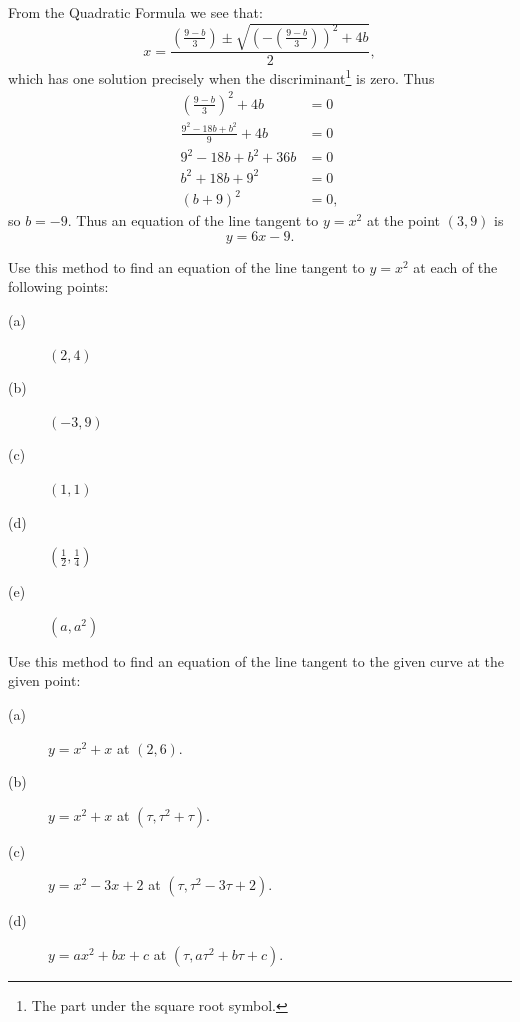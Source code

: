 \begin{myexample}
    From the Quadratic Formula we see that:
    $$
    x=
    \frac{\left(\frac{9-b}{3}\right)\pm\sqrt{\left(-\left(\frac{9-b}{3}\right)\right)^2+4b}}{2},
    $$
    which has one solution precisely when the discriminant\footnote{The part under
    the square root symbol.} is zero. Thus
  \begin{align*}
   \left(\frac{9-b}{3}\right)^2+4b&=0\\
     \frac{9^2-18b+b^2}{9}+4b&=0\\
    9^2-18b+b^2+36b&=0\\
    b^2+18b+9^2&=0\\
    (b+9)^2&=0,
  \end{align*}
so $b=-9.$ Thus an equation of the line tangent to $y=x^2$ at the point
$(3,9)$ is
$$
y=6x-9.
$$

  

\begin{embeddedproblem}{}
  Use this method to find an equation of the line tangent to
  $y=x^2$ at each of the following points:\\
  \begin{description}
  \item[(a)] $(2,4)$
  \item[(b)] $(-3,9)$
  \item[(c)] $(1,1)$
  \item[(d)] $\left(\frac12,\frac14\right)$
  \item[(e)] $(a,a^2)$
  \end{description}
\end{embeddedproblem}  

\begin{embeddedproblem}{}
  Use this method to find an equation of the line tangent to the given
  curve  at the given point:\\
  \begin{description}
  \item[(a)] $y=x^2+x$ at $(2,6).$
  \item[(b)] $y=x^2+x$ at $(\tau,\tau^2+\tau).$
  \item[(c)] $y=x^2-3x+2$ at $(\tau,\tau^2-3\tau+2).$
  \item[(d)] $y=ax^2+bx+c$ at $(\tau,a\tau^2+b\tau+c).$
  \end{description}
\end{embeddedproblem}
\end{myexample}

